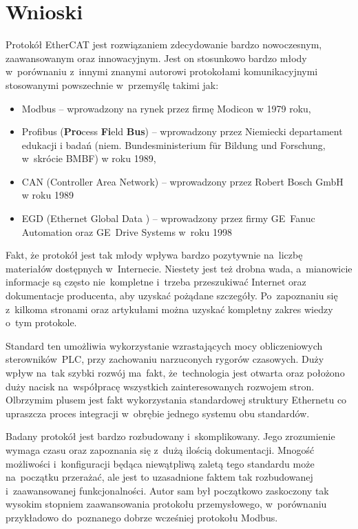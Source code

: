 \section{Wnioski}
Protokół EtherCAT jest rozwiązaniem zdecydowanie bardzo nowoczesnym, zaawansowanym oraz innowacyjnym. 
Jest on stosunkowo bardzo młody w~porównaniu z~innymi znanymi autorowi protokołami komunikacyjnymi stosowanymi powszechnie w~przemyślę takimi jak:
\begin{itemize}
\item Modbus -- wprowadzony na rynek przez firmę Modicon w 1979 roku,
\item Profibus (\textbf{Pro}cess \textbf{Fi}eld \textbf{Bus}) -- wprowadzony przez Niemiecki departament edukacji i badań (niem. Bundesministerium für Bildung und Forschung, w~skrócie BMBF) w roku 1989,
\item CAN (Controller Area Network) -- wprowadzony przez Robert Bosch GmbH w roku 1989
\item EGD (Ethernet Global Data ) -- wprowadzony przez firmy GE~Fanuc Automation oraz GE~Drive Systems w~roku 1998
\end{itemize}

Fakt, że protokół jest tak młody wpływa bardzo pozytywnie na~liczbę materiałów dostępnych w~Internecie. Niestety jest też drobna wada, a~mianowicie informacje są często nie~kompletne i~trzeba przeszukiwać Internet oraz dokumentacje producenta, aby uzyskać pożądane szczegóły. Po~zapoznaniu się z~kilkoma stronami oraz artykułami można uzyskać kompletny zakres wiedzy o~tym protokole.

Standard ten umożliwia wykorzystanie wzrastających mocy obliczeniowych sterowników~PLC, przy zachowaniu narzuconych rygorów czasowych. Duży wpływ na~tak szybki rozwój ma~fakt, że~technologia jest otwarta oraz położono duży nacisk na~współpracę wszystkich zainteresowanych rozwojem stron. Olbrzymim plusem jest fakt wykorzystania standardowej struktury Ethernetu co upraszcza proces integracji w~obrębie jednego systemu obu standardów.

Badany protokół jest bardzo rozbudowany i~skomplikowany. Jego zrozumienie wymaga czasu oraz zapoznania się z~dużą ilością dokumentacji. Mnogość możliwości i~konfiguracji będąca niewątpliwą zaletą tego standardu może na~początku przerażać, ale jest to uzasadnione faktem tak rozbudowanej i~zaawansowanej funkcjonalności. Autor sam był początkowo zaskoczony tak wysokim stopniem zaawansowania protokołu przemysłowego, w~porównaniu przykładowo do~poznanego dobrze wcześniej protokołu Modbus.


